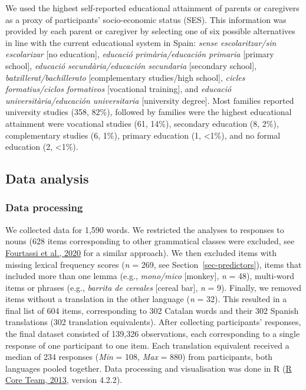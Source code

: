 \documentclass[
]{article}
\begin{document}
We used the highest self-reported educational attainment of parents or
caregivers as a proxy of participants' socio-economic status (SES). This
information was provided by each parent or caregiver by selecting one of
six possible alternatives in line with the current educational system in
Spain: \emph{sense escolaritzar/sin escolarizar} {[}no education{]},
\emph{educació primària/educación primaria} {[}primary school{]},
\emph{educació secundària/educación secundaria} {[}secondary school{]},
\emph{batxillerat/bachillerato} {[}complementary studies/high school{]},
\emph{cicles formatius/ciclos formativos} {[}vocational training{]}, and
\emph{educació universitària/educación universitaria} {[}university
degree{]}. Most families reported university studies (358, 82\%),
followed by families were the highest educational attainment were
vocational studies (61, 14\%), secondary education (8, 2\%),
complementary studies (6, 1\%), primary education (1, \textless1\%), and
no formal education (2, \textless1\%).

\hypertarget{sec-analysis}{%
\subsection{Data analysis}\label{sec-analysis}}

\hypertarget{data-processing}{%
\subsubsection{Data processing}\label{data-processing}}

We collected data for 1,590 words. We restricted the analyses to
responses to nouns (628 items corresponding to other grammatical classes
were excluded, see \protect\hyperlink{ref-fourtassi2020growth}{Fourtassi
et al., 2020} for a similar approach). We then excluded items with
missing lexical frequency scores (\emph{n} = 269, see
Section~\ref{sec-predictors}), items that included more than one lemma
(e.g., \emph{mono/mico} {[}monkey{]}, \emph{n} = 48), multi-word items
or phrases (e.g., \emph{barrita de cereales} {[}cereal bar{]}, \emph{n}
= 9). Finally, we removed items without a translation in the other
language (\emph{n} = 32). This resulted in a final list of 604 items,
corresponding to 302 Catalan words and their 302 Spanish translations
(302 translation equivalents). After collecting participants' responses,
the final dataset consisted of 139,326 observations, each corresponding
to a single response of one participant to one item. Each translation
equivalent received a median of 234 responses (\emph{Min} = 108,
\emph{Max} = 880) from participants, both languages pooled together.
Data processing and visualisation was done in R
(\protect\hyperlink{ref-rcoreteam2013language}{R Core Team, 2013},
version 4.2.2).
\end{document}
